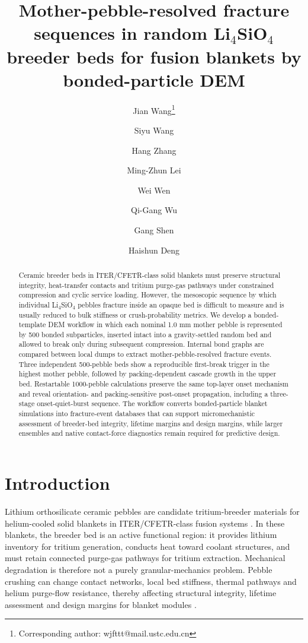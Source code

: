 \documentclass[10pt,twocolumn]{article}
\title{Mother-pebble-resolved fracture sequences in random Li$_4$SiO$_4$ breeder beds for fusion blankets by bonded-particle DEM}
\author[1,2]{Jian Wang\thanks{Corresponding author: wjfttt@mail.ustc.edu.cn}}
\author[1]{Siyu Wang}
\author[1]{Hang Zhang}
\author[2]{Ming-Zhun Lei}
\author[1,2]{Wei Wen}
\author[2]{Qi-Gang Wu}
\author[1]{Gang Shen}
\author[1]{Haishun Deng}
\affil[1]{Anhui University of Science and Technology, Huainan, Anhui 232001, China}
\affil[2]{Institute of Plasma Physics, Chinese Academy of Sciences, Hefei, Anhui 230031, China}
\date{}
\begin{document}
\maketitle











\begin{abstract}

Ceramic breeder beds in ITER/CFETR-class solid blankets must preserve structural integrity, heat-transfer contacts and tritium purge-gas pathways under constrained compression and cyclic service loading. However, the mesoscopic sequence by which individual Li$_4$SiO$_4$ pebbles fracture inside an opaque bed is difficult to measure and is usually reduced to bulk stiffness or crush-probability metrics. We develop a bonded-template DEM workflow in which each nominal 1.0 mm mother pebble is represented by 500 bonded subparticles, inserted intact into a gravity-settled random bed and allowed to break only during subsequent compression. Internal bond graphs are compared between local dumps to extract mother-pebble-resolved fracture events. Three independent 500-pebble beds show a reproducible first-break trigger in the highest mother pebble, followed by packing-dependent cascade growth in the upper bed. Restartable 1000-pebble calculations preserve the same top-layer onset mechanism and reveal orientation- and packing-sensitive post-onset propagation, including a three-stage onset-quiet-burst sequence. The workflow converts bonded-particle blanket simulations into fracture-event databases that can support micromechanistic assessment of breeder-bed integrity, lifetime margins and design margins, while larger ensembles and native contact-force diagnostics remain required for predictive design.


\end{abstract}

\section{Introduction}

Lithium orthosilicate ceramic pebbles are candidate tritium-breeder materials for helium-cooled solid blankets in ITER/CFETR-class fusion systems \cite{Piazza2002CeramicBreederMaterials,Reimann2000ThermomechanicalPebbleBeds}. In these blankets, the breeder bed is an active functional region: it provides lithium inventory for tritium generation, conducts heat toward coolant structures, and must retain connected purge-gas pathways for tritium extraction. Mechanical degradation is therefore not a purely granular-mechanics problem. Pebble crushing can change contact networks, local bed stiffness, thermal pathways and helium purge-flow resistance, thereby affecting structural integrity, lifetime assessment and design margins for blanket modules \cite{CrushedPebblePressureDrop2024}.
\end{document}
